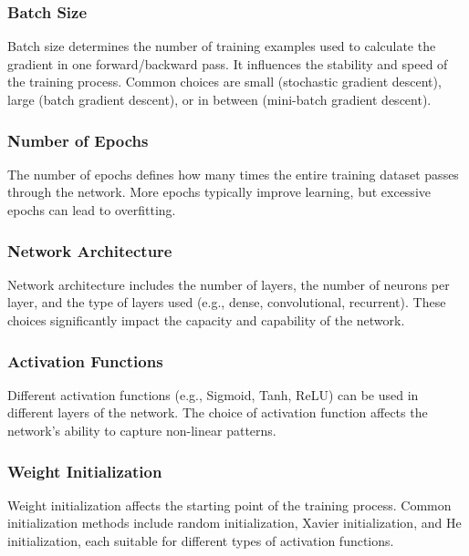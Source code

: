 \documentclass{report}
\begin{document}
        \subsubsection{Batch Size}
        
        Batch size determines the number of training examples used to calculate the gradient in one forward/backward pass. It influences the stability and speed of the training process. Common choices are small (stochastic gradient descent), large (batch gradient descent), or in between (mini-batch gradient descent).
        
        \subsubsection{Number of Epochs}
        
        The number of epochs defines how many times the entire training dataset passes through the network. More epochs typically improve learning, but excessive epochs can lead to overfitting.
        
        \subsubsection{Network Architecture}
        
        Network architecture includes the number of layers, the number of neurons per layer, and the type of layers used (e.g., dense, convolutional, recurrent). These choices significantly impact the capacity and capability of the network.
        
        \subsubsection{Activation Functions}
        
        Different activation functions (e.g., Sigmoid, Tanh, ReLU) can be used in different layers of the network. The choice of activation function affects the network's ability to capture non-linear patterns.
        
        \subsubsection{Weight Initialization}
        
        Weight initialization affects the starting point of the training process. Common initialization methods include random initialization, Xavier initialization, and He initialization, each suitable for different types of activation functions.
        
\end{document}
